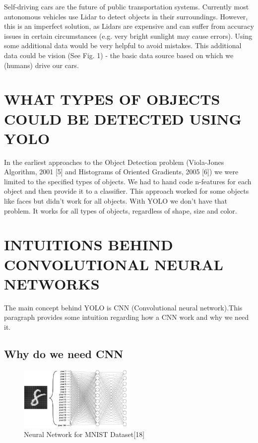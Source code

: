\documentclass[letterpaper, 10 pt, conference]{ieeeconf}  %
\begin{document}
Self-driving cars are the future of public transportation systems. Currently most autonomous vehicles use Lidar to detect objects in their surroundings. However, this is an imperfect solution, as  Lidars are expensive and can suffer from accuracy issues in certain circumstances (e.g. very bright sunlight may cause errors). Using some additional data would be very helpful to avoid mistakes. This additional data could be vision (See Fig. 1) - the basic data source based on which we (humans) drive our cars.

\section{WHAT TYPES OF OBJECTS COULD BE DETECTED USING YOLO}

In the earliest approaches to the Object Detection problem (Viola-Jones Algorithm, 2001 [5] and Histograms of Oriented Gradients, 2005 [6]) we were limited to the specified types of objects. We had to hand code n-features for each object and then provide it to a classifier. This approach worked for some objects like faces but didn't work for all objects. With YOLO we don't have that problem. It works for all types of objects, regardless of shape, size and color.

\section{INTUITIONS BEHIND CONVOLUTIONAL NEURAL NETWORKS}

The main concept behind YOLO is CNN (Convolutional neural network).This paragraph provides some intuition regarding how a CNN work and why we need it. 

\subsection{Why do we need CNN}

\begin{figure}[ht]
	\centering
    \includegraphics[width=0.5\textwidth]{Pictures/mnist_2layers.png}
	\caption{Neural Network for MNIST Dataset[18]}
\end{figure}
\end{document}
